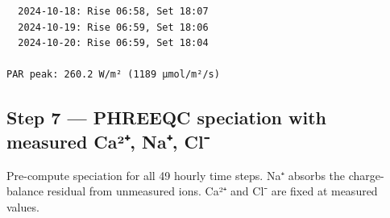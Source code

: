\documentclass[
  letterpaper,
  DIV=11,
  numbers=noendperiod]{scrartcl}
\begin{document}
\begin{verbatim}
  2024-10-18: Rise 06:58, Set 18:07
  2024-10-19: Rise 06:59, Set 18:06
  2024-10-20: Rise 06:59, Set 18:04

PAR peak: 260.2 W/m² (1189 µmol/m²/s)
\end{verbatim}

\subsection{Step 7 --- PHREEQC speciation with measured Ca²⁺, Na⁺,
Cl⁻}\label{step-7-phreeqc-speciation-with-measured-cauxb2-na-cl}

Pre-compute speciation for all 49 hourly time steps. Na⁺ absorbs the
charge-balance residual from unmeasured ions. Ca²⁺ and Cl⁻ are fixed at
measured values.
\end{document}
